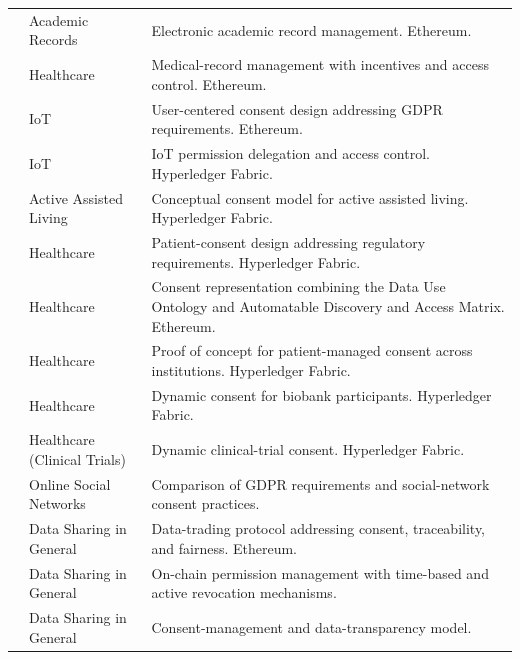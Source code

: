 \begin{longtable}{@{}>{\raggedright\arraybackslash}m{}>{\raggedright\arraybackslash}m{}>{\raggedright\arraybackslash}m{}@{}}
\addlinespace[5pt]
\cite{2019-unichain-blockchain-acad-records} & Academic Records & Electronic academic record management. Ethereum. \\
\addlinespace[5pt]
\cite{2019-medchain} & Healthcare & Medical-record management with incentives and access control. Ethereum. \\
\addlinespace[5pt]
\cite{2018-advocate} & IoT & User-centered consent design addressing GDPR requirements. Ethereum. \\
\addlinespace[5pt]
\cite{2019-blockchain-permission-iot} & IoT & IoT permission delegation and access control. Hyperledger Fabric. \\
\addlinespace[5pt]
\cite{2020-blockchain-assisted-living} & Active Assisted Living & Conceptual consent model for active assisted living. Hyperledger Fabric. \\
\addlinespace[5pt]
\cite{2020-consent-design-bc-based-consent-manag} & Healthcare & Patient-consent design addressing regulatory requirements. Hyperledger Fabric. \\
\addlinespace[5pt]
\cite{2020-consent-health} & Healthcare & Consent representation combining the Data Use Ontology and Automatable Discovery and Access Matrix. Ethereum. \\
\addlinespace[5pt]
\cite{2020-patient-consent-e-health} & Healthcare & Proof of concept for patient-managed consent across institutions. Hyperledger Fabric. \\
\addlinespace[5pt]
\cite{2020-consent-biobanking} & Healthcare & Dynamic consent for biobank participants. Hyperledger Fabric. \\
\addlinespace[5pt]
\cite{2020-consent-clinical-trials} & Healthcare (Clinical Trials) & Dynamic clinical-trial consent. Hyperledger Fabric. \\
\addlinespace[5pt]
\cite{10.1109/ICICT50521.2020.00054} & Online Social Networks & Comparison of GDPR requirements and social-network consent practices. \\
\addlinespace[5pt]
\cite{10.1109/COMSNETS51098.2021.9352817} & Data Sharing in General & Data-trading protocol addressing consent, traceability, and fairness. Ethereum. \\
\addlinespace[5pt]
\cite{10.1007/978-3-030-78621-2_54} & Data Sharing in General & On-chain permission management with time-based and active revocation mechanisms. \\
\addlinespace[5pt]
\cite{10.1109/QRS-C55045.2021.00159} & Data Sharing in General & Consent-management and data-transparency model. \\

\end{longtable}
